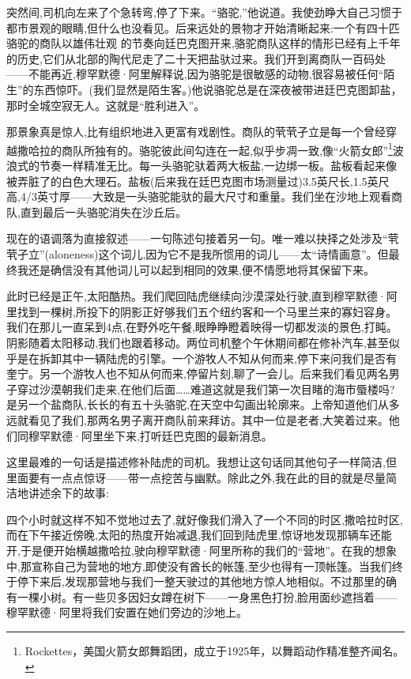 突然间,司机向左来了个急转弯,停了下来。“骆驼,”他说道。我使劲睁大自己习惯于都市景观的眼睛,但什么也没看见。后来远处的景物才开始清晰起来:一个有四十匹骆驼的商队以雄伟壮观 的节奏向廷巴克图开来,骆驼商队这样的情形已经有上千年的历史,它们从北部的陶代尼走了二十天把盐驮过来。我们开到离商队一百码处——不能再近,穆罕默德·阿里解释说,因为骆驼是很敏感的动物,很容易被任何“陌生”的东西惊吓。(我们显然是陌生客。)他说骆驼总是在深夜被带进廷巴克图卸盐，那时全城空寂无人。这就是“胜利进入”。

那景象真是惊人,比有组织地进入更富有戏剧性。商队的茕茕孑立是每一个曾经穿越撒哈拉的商队所独有的。骆驼彼此间勾连在一起,似乎步凋一致,像“火箭女郎”\footnote{Rockettes，美国火箭女郎舞蹈团，成立于1925年，以舞蹈动作精准整齐闻名。}波浪式的节奏一样精准无比。每一头骆驼驮着两大板盐,一边绑一板。盐板看起来像被弄脏了的白色大理石。盐板(后来我在廷巴克图市场测量过)3.5英尺长,1.5英尺高,4/3英寸厚——大致是一头骆驼能驮的最大尺寸和重量。我们坐在沙地上观看商队,直到最后一头骆驼消失在沙丘后。

现在的语调落为直接叙述——一句陈述句接着另一句。唯一难以抉择之处涉及“茕茕孑立”(aloneness)这个词儿,因为它不是我所惯用的词儿——太“诗情画意”。但最终我还是确信没有其他词儿可以起到相同的效果,便不情愿地将其保留下来。

此时已经是正午,太阳酷热。我们爬回陆虎继续向沙漠深处行驶,直到穆罕默德·阿里找到一棵树,所投下的阴影正好够我们五个纽约客和一个马里兰来的寡妇容身。我们在那儿一直呆到4点,在野外吃午餐,眼睁睁瞪着映得一切都发淡的景色,打盹。阴影随着太阳移动,我们也跟着移动。两位司机整个午休期间都在修补汽车,甚至似乎是在拆卸其中一辆陆虎的引擎。一个游牧人不知从何而来,停下来问我们是否有奎宁。另一个游牧人也不知从何而来,停留片刻,聊了一会儿。后来我们看见两名男子穿过沙漠朝我们走来,在他们后面……难道这就是我们第一次目睹的海市蜃楼吗?是另一个盐商队,长长的有五十头骆驼,在天空中勾画出轮廓来。上帝知道他们从多远就看见了我们,那两名男子离开商队前来拜访。其中一位是老者,大笑着过来。他们同穆罕默德·阿里坐下来,打听廷巴克图的最新消息。

这里最难的一句话是描述修补陆虎的司机。我想让这句话同其他句子一样简洁,但里面要有一点点惊讶——带一点挖苦与幽默。除此之外,我在此的目的就是尽量简洁地讲述余下的故事:

四个小时就这样不知不觉地过去了,就好像我们滑入了一个不同的时区,撒哈拉时区,而在下午接近傍晚,太阳的热度开始减退,我们回到陆虎里,惊讶地发现那辆车还能开,于是便开始横越撒哈拉,驶向穆罕默德·阿里所称的我们的“营地”。在我的想象中,那宣称自己为营地的地方,即使没有酋长的帐篷,至少也得有一顶帐篷。当我们终于停下来后,发现那营地与我们一整天驶过的其他地方惊人地相似。不过那里的确有一棵小树。有一些贝多因妇女蹲在树下——一身黑色打扮,脸用面纱遮挡着——穆罕默德·阿里将我们安置在她们旁边的沙地上。


